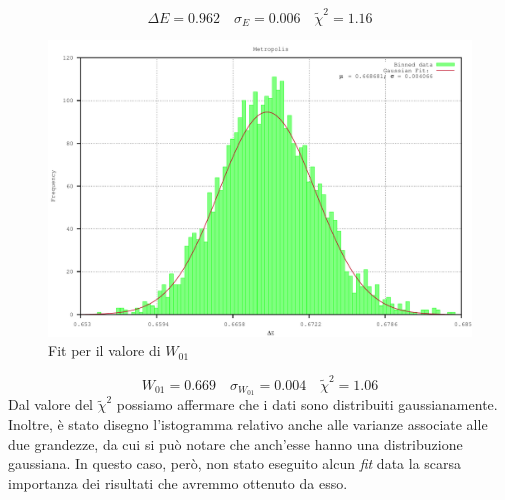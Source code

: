 $$ 
  \Delta E = 0.962 \quad \sigma_{E} = 0.006 \quad \tilde{\chi}^2 = 1.16
$$
 
 \begin{figure}
\centering
\includegraphics[width=\columnwidth]{fit-matrix.pdf}
 \caption{\small{Fit per il valore di $W_{01}$}}
 \end{figure}
$$
  W_{01} = 0.669 \quad \sigma_{W_{01}} = 0.004 \quad \tilde{\chi}^2 = 1.06
$$
Dal valore del $\tilde{\chi}^2$ possiamo affermare che i dati sono distribuiti gaussianamente.\\
 Inoltre, è stato disegno l'istogramma relativo anche alle varianze associate alle due grandezze,
da cui si può notare che anch'esse hanno una distribuzione gaussiana. In questo caso, però, non stato eseguito alcun \emph{fit} data la scarsa importanza
dei risultati che avremmo ottenuto da esso.
